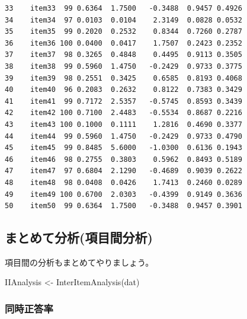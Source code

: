 \documentclass[
  a4paper,
]{ltjsbook}
\newenvironment{Shaded}{\begin{snugshade}}{\end{snugshade}}
\newcommand{\FunctionTok}[1]{\textcolor[rgb]{0.28,0.35,0.67}{#1}}
\newcommand{\NormalTok}[1]{\textcolor[rgb]{0.00,0.23,0.31}{#1}}
\newcommand{\OtherTok}[1]{\textcolor[rgb]{0.00,0.23,0.31}{#1}}
\newcommand{\SpecialCharTok}[1]{\textcolor[rgb]{0.37,0.37,0.37}{#1}}
\begin{document}
\begin{verbatim}
33    item33  99 0.6364  1.7500   -0.3488  0.9457 0.4926
34    item34  97 0.0103  0.0104    2.3149  0.0828 0.0532
35    item35  99 0.2020  0.2532    0.8344  0.7260 0.2787
36    item36 100 0.0400  0.0417    1.7507  0.2423 0.2352
37    item37  98 0.3265  0.4848    0.4495  0.9113 0.3505
38    item38  99 0.5960  1.4750   -0.2429  0.9733 0.3775
39    item39  98 0.2551  0.3425    0.6585  0.8193 0.4068
40    item40  96 0.2083  0.2632    0.8122  0.7383 0.3429
41    item41  99 0.7172  2.5357   -0.5745  0.8593 0.3439
42    item42 100 0.7100  2.4483   -0.5534  0.8687 0.2216
43    item43 100 0.1000  0.1111    1.2816  0.4690 0.3377
44    item44  99 0.5960  1.4750   -0.2429  0.9733 0.4790
45    item45  99 0.8485  5.6000   -1.0300  0.6136 0.1943
46    item46  98 0.2755  0.3803    0.5962  0.8493 0.5189
47    item47  97 0.6804  2.1290   -0.4689  0.9039 0.2622
48    item48  98 0.0408  0.0426    1.7413  0.2460 0.0289
49    item49 100 0.6700  2.0303   -0.4399  0.9149 0.3636
50    item50  99 0.6364  1.7500   -0.3488  0.9457 0.3901
\end{verbatim}

\subsection{まとめて分析(項目間分析)}\label{ux307eux3068ux3081ux3066ux5206ux6790ux9805ux76eeux9593ux5206ux6790}

項目間の分析もまとめてやりましょう。

\begin{Shaded}
\begin{Highlighting}[]
\NormalTok{IIAnalysis }\OtherTok{\textless{}{-}} \FunctionTok{InterItemAnalysis}\NormalTok{(dat)}
\end{Highlighting}
\end{Shaded}

\subsubsection{同時正答率}\label{ux540cux6642ux6b63ux7b54ux7387}

\begin{Shaded}
\end{Shaded}
\end{document}
